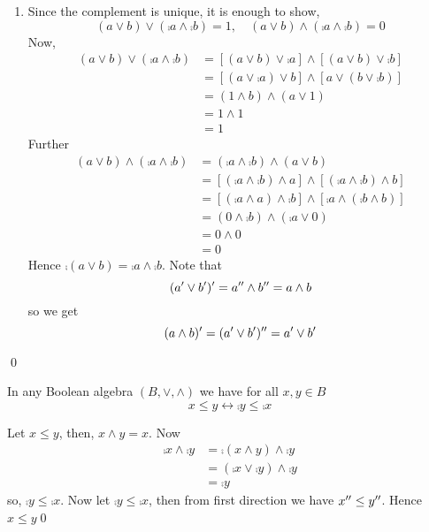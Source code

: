 \begin{myproof}
\begin{enumerate}
        \item Since the complement is unique, it is enough to show,
        \[
        (a\vee b)\vee(\comp{a}\wedge\comp{b})=1,\quad (a\vee b)\wedge(\comp{a}\wedge\comp{b})=0
        \]
        Now,
        \begin{align*}
            (a\vee b)\vee(\comp{a}\wedge\comp{b})&=[(a\vee b)\vee\comp{a}]\wedge[(a\vee b)\vee\comp{b}]\\
            &=[(a\vee\comp{a})\vee b]\wedge[a\vee(b\vee\comp{b})]\\
            &=(1\wedge b)\wedge(a\vee 1)\\
            &=1\wedge 1\\
            &=1
        \end{align*}
        Further
        \begin{align*}
            (a\vee b)\wedge(\comp{a}\wedge\comp{b})&=(\comp{a}\wedge\comp{b})\wedge(a\vee b)\\
            &=[(\comp{a}\wedge\comp{b})\wedge a]\wedge[(\comp{a}\wedge\comp{b})\wedge b]\\
            &=[(\comp{a}\wedge a)\wedge\comp{b}]\wedge[\comp{a}\wedge(\comp{b}\wedge b)]\\
            &=(0\wedge\comp{b})\wedge(\comp{a}\vee0)\\
            &=0\wedge0\\
            &=0
        \end{align*}
        Hence \(\comp{(a\vee b)}=\comp{a}\wedge\comp{b}\). Note that
        \[ (a^{\prime}\vee b^{\prime})^{\prime}=a^{\prime\prime}\wedge b^{\prime\prime}=a\wedge b
        \]
        so we get 
        \[
        (a\wedge b)^{\prime}=(a^{\prime}\vee b^{\prime})^{\prime\prime}=a^{\prime}\vee b^{\prime}
        \]
    \end{enumerate}\qed
\end{myproof}

\begin{cor}
    In any Boolean algebra \((B,\vee,\wedge)\) we have for all \(x,y\in B\)
    \[
    x\leq y\longleftrightarrow \comp{y}\leq\comp{x}
    \]
\end{cor}

\begin{myproof}
    Let \(x\leq y\), then, \(x\wedge y=x\). Now
    \begin{align*}
        \comp{x}\wedge\comp{y}&=\comp{(x\wedge y)}\wedge\comp{y}\\
        &=(\comp{x}\vee\comp{y})\wedge\comp{y}\\
        &=\comp{y}
    \end{align*}
    so, \(\comp{y}\leq\comp{x}\). Now let \(\comp{y}\leq\comp{x}\), then from first direction we have \(x^{\prime\prime}\leq y^{\prime\prime}\). Hence \(x\leq y\)\qed
\end{myproof}

